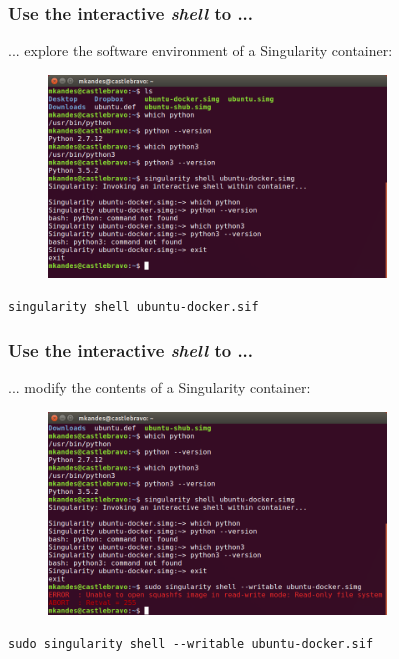 \documentclass{beamer}
\begin{document}
\begin{frame}
   \frametitle{Use the interactive \textit{shell} to ... }
   ... explore the software environment of a Singularity container:
   \begin{figure}[htbp]
      \includegraphics[width=0.8\textwidth]{images/singularity-shell-docker-python.png}
   \end{figure}
   \lstinline{singularity shell ubuntu-docker.sif}
\end{frame}

\begin{frame}
   \frametitle{Use the interactive \textit{shell} to ... }
   ... modify the contents of a Singularity container:
   \begin{figure}[htbp]
      \includegraphics[width=0.8\textwidth]{images/singularity-shell-writable-fail.png}
   \end{figure}
   \lstinline{sudo singularity shell --writable ubuntu-docker.sif}
\end{frame}
\end{document}
